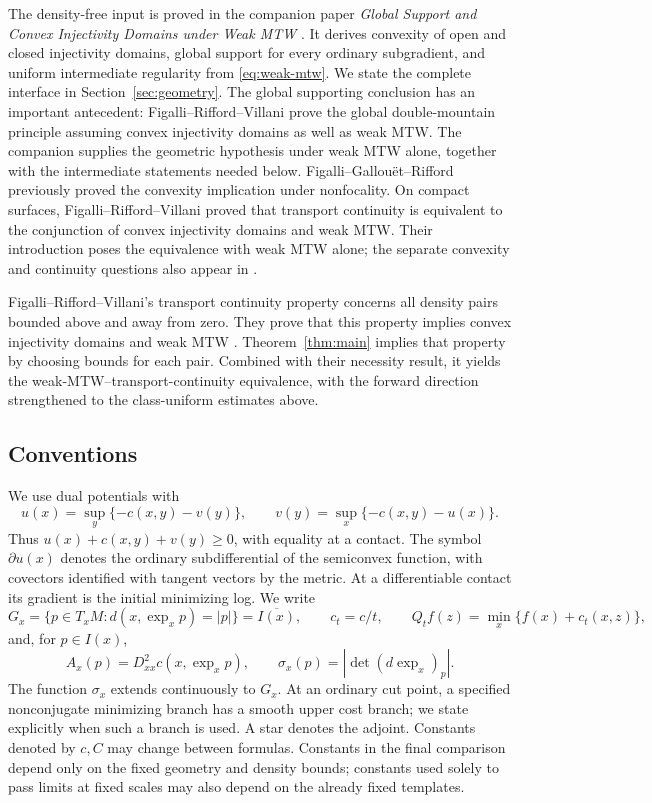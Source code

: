The density-free input is proved in the companion paper
\emph{Global Support and Convex Injectivity Domains under Weak MTW}
\cite{Foundation2026}. It derives convexity of open and closed
injectivity domains, global support for every ordinary subgradient,
and uniform intermediate regularity from \eqref{eq:weak-mtw}.
We state the complete interface in Section~\ref{sec:geometry}.
The global supporting conclusion has an important antecedent:
Figalli--Rifford--Villani \cite[Lemma~3.1]{FRV2011} prove the
global double-mountain principle assuming convex injectivity
domains as well as weak MTW. The companion supplies the geometric
hypothesis under weak MTW alone, together with the intermediate
statements needed below. Figalli--Gallou\"et--Rifford
\cite[Theorem~1.7]{FGR2015} previously proved the convexity
implication under nonfocality. On compact surfaces,
Figalli--Rifford--Villani \cite[Theorem~1.3]{FRV2011} proved that
transport continuity is equivalent to the conjunction of convex
injectivity domains and weak MTW. Their introduction poses the
equivalence with weak MTW alone; the separate convexity and continuity
questions also appear in \cite[Questions~8.6--8.7]{LPZ2019}.

Figalli--Rifford--Villani's transport continuity property concerns
all density pairs bounded above and away from zero. They prove that
this property implies convex injectivity domains and weak MTW
\cite[Definition~1.1 and Theorem~1.2(i)]{FRV2011}.
Theorem~\ref{thm:main} implies that property by choosing bounds for
each pair. Combined with their necessity result, it yields the
weak-MTW--transport-continuity equivalence, with the forward
direction strengthened to the class-uniform estimates above.

\subsection{Conventions}

We use dual potentials with
\[
 u(x)=\sup_y\{-c(x,y)-v(y)\},\qquad
 v(y)=\sup_x\{-c(x,y)-u(x)\}.
\]
Thus $u(x)+c(x,y)+v(y)\geq0$, with equality at a contact.
The symbol $\partial u(x)$ denotes the ordinary subdifferential
of the semiconvex function, with covectors identified with tangent
vectors by the metric. At a differentiable contact its gradient
is the initial minimizing log. We write
\[
 G_x=\{p\in T_xM:d(x,\exp_xp)=|p|\}=\overline{I(x)},\qquad
 c_t=c/t,\qquad Q_tf(z)=\min_x\{f(x)+c_t(x,z)\},
\]
and, for $p\in I(x)$,
\[
 A_x(p)=D^2_{xx}c(x,\exp_xp),\qquad
 \sigma_x(p)=|\det(d\exp_x)_p|.
\]
The function $\sigma_x$ extends continuously to $G_x$. At an
ordinary cut point, a specified nonconjugate minimizing branch
has a smooth upper cost branch; we state explicitly when such a
branch is used. A star denotes the adjoint. Constants denoted by
$c,C$ may change between formulas. Constants in the final
comparison depend only on the fixed geometry and density bounds;
constants used solely to pass limits at fixed scales may also
depend on the already fixed templates.


